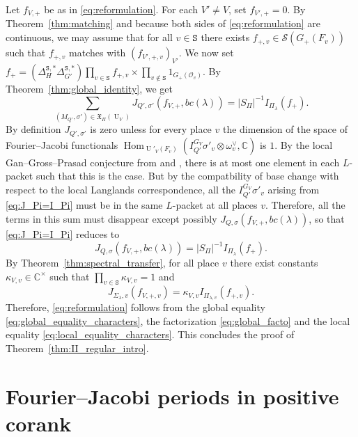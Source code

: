 \documentclass[letterpaper,11pt]{amsart}
\newcommand{\fX}{\mathfrak{X}}
\newcommand{\C}{\mathbb{C}}
\newcommand{\cO}{\mathcal{O}}
\newcommand{\cS}{\mathcal{S}}
\newcommand{\tS}{\mathtt{S}}
\newcommand{\<}{\negthickspace}
\DeclareMathOperator{\U}{U}
\DeclareMathOperator{\Hom}{Hom}
\theoremstyle{definition}
\theoremstyle{plain}
\theoremstyle{remark}
\numberwithin{equation}{section}
\begin{document}
Let $f_{V,+}$ be as in \eqref{eq:reformulation}. For each $V' \neq V$, set $f_{V',+}=0$. By Theorem~\ref{thm:matching} and because both sides of \eqref{eq:reformulation} are continuous, we may assume that for all $v \in \tS$ there exists $f_{+,v} \in \cS(G_+(F_v))$ such that $f_{+,v}$ matches with $(f_{V',+,v})_{V'}$. We now set $f_+= (\Delta_H^{\tS,*} \Delta_{G'}^{\tS,*}) \prod_{v \in \tS}f_{+,v} \times \prod_{v \notin \tS} 1_{G_+(\cO_v)}$. By Theorem~\ref{thm:global_identity}, we get
 \begin{equation}
 \label{eq:J_Pi=I_Pi}
 \sum_{(M_{Q'},\sigma') \in \fX_\Pi(\U_V)} J_{Q',\sigma'}(f_{V,+},bc(\lambda))= |S_\Pi|^{-1} I_{\Pi_\lambda}(f_+).
\end{equation}
By definition $J_{Q',\sigma'}$ is zero unless for every place $v$ the dimension of the space of Fourier--Jacobi functionals $\Hom_{\U'_V(F_v)}(I_{Q'}^{G_{V}} \sigma'_v \otimes \omega^\vee_v,\C)$ is $1$. By the local Gan--Gross--Prasad conjecture from \cite{GI2} and \cite{Xue6}, there is at most one element in each $L$-packet such that this is the case. But by the compatbility of base change with respect to the local Langlands correspondence, all the $I_{Q'}^{G_{V}} \sigma'_v$ arising from \eqref{eq:J_Pi=I_Pi} must be in the same $L$-packet at all places $v$. Therefore, all the terms in this sum must disappear except possibly $J_{Q,\sigma}(f_{V,+},bc(\lambda))$, so that \eqref{eq:J_Pi=I_Pi} reduces to
\begin{equation}
\label{eq:global_equality_characters}
    J_{Q,\sigma}(f_{V,+},bc(\lambda)) = |S_\Pi|^{-1} I_{\Pi_\lambda}(f_+).
\end{equation}
By Theorem~\ref{thm:spectral_transfer}, for all place $v$ there exist constants $\kappa_{V,v} \in \C^\times$ such that $\prod_{v \in \tS} \kappa_{V,v}=1$ and
\begin{equation}
\label{eq:local_equality_characters}
J_{\Sigma_\lambda,v}(f_{V,+,v})=\kappa_{V,v}I_{\Pi_{\lambda,v}}(f_{+,v}).
\end{equation}
Therefore, \eqref{eq:reformulation} follows from the global equality \eqref{eq:global_equality_characters}, the factorization \eqref{eq:global_facto} and the local equality \eqref{eq:local_equality_characters}. This concludes the proof of Theorem~\ref{thm:II_regular_intro}.

\part{Fourier--Jacobi periods in positive corank}
\label{part:positive}
\end{document}
